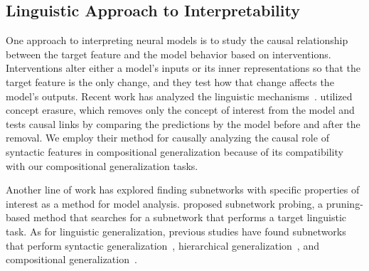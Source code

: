 \subsection{Linguistic Approach to Interpretability}
\label{subsec:interpretability}

One approach to interpreting neural models is to study the causal relationship between the target feature and the model behavior based on interventions.
Interventions alter either a model's inputs or its inner representations so that the target feature is the only change, and they test how that change affects the model's outputs.
Recent work has analyzed the linguistic mechanisms~\citep{tucker-etal-2021-modified, elazar-etal-2021-amnesic, ravfogel-etal-2021-counterfactual, feder-etal-2021-causalm, amini-etal-2023-naturalistic, belrose2023leace, arora-etal-2024-causalgym}.
\citet{belrose2023leace} utilized concept erasure, which removes only the concept of interest from the model and tests causal links by comparing the predictions by the model before and after the removal.
We employ their method for causally analyzing the causal role of syntactic features in compositional generalization because of its compatibility with our compositional generalization tasks.

Another line of work has explored finding subnetworks with specific properties of interest as a method for model analysis.
\citet{cao-etal-2021-low} proposed subnetwork probing, a pruning-based method that searches for a subnetwork that performs a target linguistic task.
As for linguistic generalization, previous studies have found subnetworks that perform syntactic generalization~\citep{bhaskar-etal-2024-heuristic},  hierarchical generalization~\citep{ahuja2024learningsyntaxplantingtrees}, and compositional generalization~\citep{hu2024compositional}.